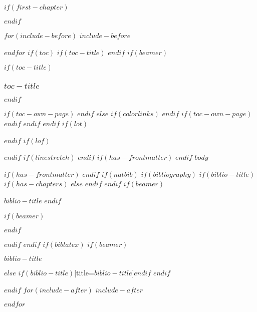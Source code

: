 \documentclass[
$if(fontsize)$
$fontsize$,
$endif$
$if(lang)$
$babel-lang$,
$endif$
$if(papersize)$
$papersize$paper,
$else$
a4paper,
$endif$
$if(beamer)$
ignorenonframetext,
$if(handout)$
handout,
$endif$
$if(aspectratio)$
aspectratio=$aspectratio$,
$endif$
$endif$
$for(classoption)$
$classoption$$sep$,
$endfor$
,tablecaptionabove
]{$if(beamer)$$documentclass$$else$$if(book)$scrbook$else$scrartcl$endif$$endif$}
\newif\ifbibliography
\begin{document}
	$if(first-chapter)$
	\setcounter{chapter}{$first-chapter$}
	\addtocounter{chapter}{-1}
	$endif$
	
	$for(include-before)$
	$include-before$
	
	$endfor$
	$if(toc)$
	$if(toc-title)$
	\renewcommand*\contentsname{$toc-title$}
	$endif$
	$if(beamer)$
	\begin{frame}
		$if(toc-title)$
		\frametitle{$toc-title$}
		$endif$
		\tableofcontents[hideallsubsections]
	\end{frame}
	$if(toc-own-page)$
	\newpage
	$endif$
	$else$
	{
		$if(colorlinks)$
		\hypersetup{linkcolor=$if(toccolor)$$toccolor$$else$$endif$}
		$endif$
		\setcounter{tocdepth}{$if(toc-depth)$$toc-depth$$else$3$endif$}
		\tableofcontents
		$if(toc-own-page)$
		\newpage
		$endif$
	}
	$endif$
	$endif$
	$if(lot)$
	\listoftables
	$endif$
	$if(lof)$
	\listoffigures
	$endif$
	$if(linestretch)$
	\setstretch{$linestretch$}
	$endif$
	$if(has-frontmatter)$
	\mainmatter
	$endif$
	$body$
	
	$if(has-frontmatter)$
	\backmatter
	$endif$
	$if(natbib)$
	$if(bibliography)$
	$if(biblio-title)$
	$if(has-chapters)$
	\renewcommand\bibname{$biblio-title$}
	$else$
	\renewcommand\refname{$biblio-title$}
	$endif$
	$endif$
	$if(beamer)$
	\begin{frame}[allowframebreaks]{$biblio-title$}
		\bibliographytrue
		$endif$
		
		$if(beamer)$
	\end{frame}
	$endif$
	
	$endif$
	$endif$
	$if(biblatex)$
	$if(beamer)$
	\begin{frame}[allowframebreaks]{$biblio-title$}
		\bibliographytrue
		\printbibliography[heading=none]
	\end{frame}
	$else$
	\printbibliography$if(biblio-title)$[title=$biblio-title$]$endif$
	$endif$
	
	$endif$
	$for(include-after)$
	$include-after$
	
	$endfor$
\end{document}
